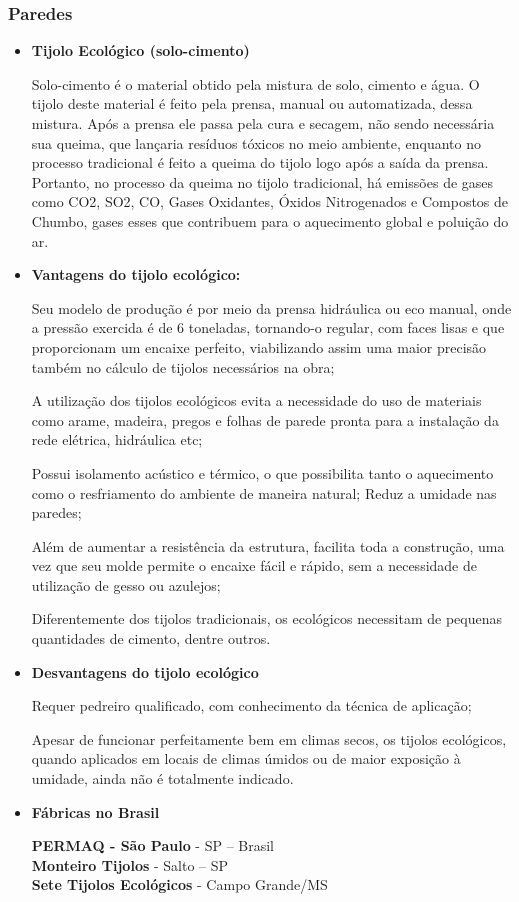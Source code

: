 \subsubsection{Paredes}
\begin{itemize}

\item \textbf{Tijolo Ecológico (solo-cimento)}

	Solo-cimento é o material obtido pela mistura de solo, cimento e água. O tijolo deste material é feito pela prensa, manual ou automatizada, dessa mistura. Após a prensa ele passa pela cura e secagem, não sendo necessária sua queima, que lançaria resíduos tóxicos no meio ambiente, enquanto no processo tradicional é feito a queima do tijolo logo após a saída da prensa. Portanto, no processo da queima no tijolo tradicional, há emissões de gases como CO2, SO2, CO, Gases Oxidantes, Óxidos Nitrogenados e Compostos de Chumbo, gases esses que contribuem para o aquecimento global e poluição do ar.\cite{Castro2011}

\item \textbf{Vantagens do tijolo ecológico:}

	Seu modelo de produção é por meio da prensa hidráulica ou eco manual, onde a pressão exercida é de 6 toneladas, tornando-o regular, com faces lisas e que proporcionam um encaixe perfeito, viabilizando assim uma maior precisão também no cálculo de tijolos necessários na obra;

	A utilização dos tijolos ecológicos evita a necessidade do uso de materiais como arame, madeira, pregos e folhas de parede pronta para a instalação da rede elétrica, hidráulica etc;

	Possui isolamento acústico e térmico, o que possibilita tanto o aquecimento como o resfriamento do ambiente de maneira natural;
Reduz a umidade nas paredes;

	Além de aumentar a resistência da estrutura, facilita toda a construção, uma vez que seu molde permite o encaixe fácil e rápido, sem a necessidade de utilização de gesso ou azulejos;

	Diferentemente dos tijolos tradicionais, os ecológicos necessitam de pequenas quantidades de cimento, dentre outros.

\item \textbf{Desvantagens do tijolo ecológico}

	Requer pedreiro qualificado, com conhecimento da técnica de aplicação;

	Apesar de funcionar perfeitamente bem em climas secos, os tijolos ecológicos, quando aplicados em locais de climas úmidos ou de maior exposição à umidade, ainda não é totalmente indicado.

\item \textbf{Fábricas no Brasil}

\textbf{PERMAQ - São Paulo} - SP – Brasil\\
\textbf{Monteiro Tijolos} - Salto – SP\\
\textbf{Sete Tijolos Ecológicos} - Campo Grande/MS

\end{itemize}

